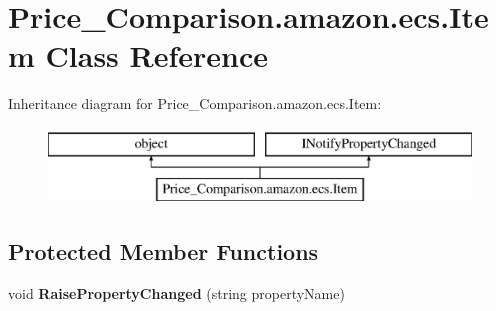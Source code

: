\hypertarget{class_price___comparison_1_1amazon_1_1ecs_1_1_item}{\section{Price\-\_\-\-Comparison.\-amazon.\-ecs.\-Item Class Reference}
\label{class_price___comparison_1_1amazon_1_1ecs_1_1_item}
}


 


Inheritance diagram for Price\-\_\-\-Comparison.\-amazon.\-ecs.\-Item\-:\begin{figure}[H]
\begin{center}
\leavevmode
\includegraphics[height=2.000000cm]{class_price___comparison_1_1amazon_1_1ecs_1_1_item}
\end{center}
\end{figure}
\subsection*{Protected Member Functions}
\begin{DoxyCompactItemize}
\item 
\hypertarget{class_price___comparison_1_1amazon_1_1ecs_1_1_item_a9220bd5c9f29e2f64d869e3e0484f654}{void {\bfseries Raise\-Property\-Changed} (string property\-Name)}\label{class_price___comparison_1_1amazon_1_1ecs_1_1_item_a9220bd5c9f29e2f64d869e3e0484f654}

\end{DoxyCompactItemize}
